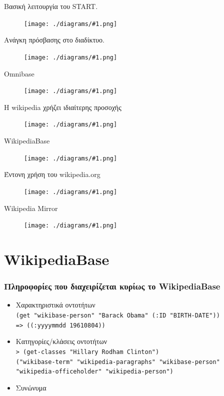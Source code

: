 \documentclass[bigger]{beamer}
\newcommand{\figframe}[2]{
  \begin{frame}{#2}
    \vfill
    \begin{figure}
      \centering
      \texttt{[image: ./diagrams/\#1.png]}
    \end{figure}
    \vfill
  \end{frame}
}
\begin{document}
\figframe{start}{Βασική λειτουργία του START.}
\figframe{start-web}{Ανάγκη πρόσβασης στο διαδίκτυο.}
\figframe{omnibase}{Omnibase}
\figframe{wikipedia-missing}{Η wikipedia χρήζει ιδιαίτερης προσοχής}
\figframe{wikipedia}{WikipediaBase}
\figframe{wikipedia-problem}{Έντονη χρήση του wikipedia.org}
\figframe{wikipedia-mirror}{Wikipedia Mirror}

\section{WikipediaBase}

\begin{frame}
  \frametitle{Πληροφορίες που διαχειρίζεται κυρίως το WikipediaBase}
  \begin{itemize}
  \item Χαρακτηριστικά οντοτήτων \\
    \texttt{(get "wikibase-person" "Barack Obama" (:ID "BIRTH-DATE"))} \\
    \texttt{=> ((:yyyymmdd 19610804))}
  \item Κατηγορίες/κλάσεις οντοτήτων \\
    \texttt{> (get-classes "Hillary Rodham Clinton")} \\
    \texttt{("wikibase-term"
      "wikipedia-paragraphs"
      "wikibase-person"
      "wikipedia-officeholder"
      "wikipedia-person")}
  \item Συνώνυμα
  \end{itemize}
\end{frame}
\end{document}
